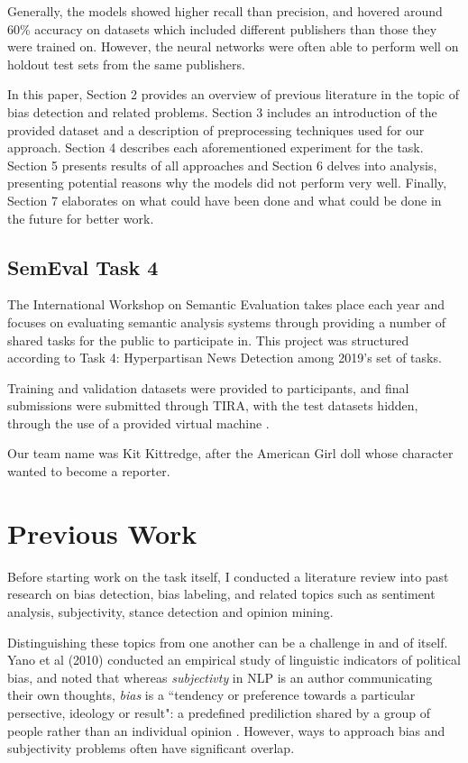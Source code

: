 \documentclass[11pt, a4paper]{article}
\begin{document}
Generally, the models showed higher recall than precision, and hovered around 60\% accuracy on datasets which included different publishers than those they were trained on. However, the neural networks were often able to perform well on holdout test sets from the same publishers.

In this paper, Section 2 provides an overview of previous literature in the topic of bias detection and related problems. Section 3 includes an introduction of the provided dataset and a description of preprocessing techniques used for our approach. Section 4 describes each aforementioned experiment for the task. Section 5 presents results of all approaches and Section 6 delves into analysis, presenting potential reasons why the models did not perform very well. Finally, Section 7 elaborates on what could have been done and what could be done in the future for better work.

\subsection{SemEval Task 4}

The International Workshop on Semantic Evaluation takes place each year and focuses on evaluating semantic analysis systems through providing a number of shared tasks for the public to participate in. This project was structured according to Task 4: Hyperpartisan News Detection among 2019's set of tasks.

Training and validation datasets were provided to participants, and final submissions were submitted through TIRA, with the test datasets hidden, through the use of a provided virtual machine \cite{potthast:2019}.

Our team name was Kit Kittredge, after the American Girl doll whose character wanted to become a reporter.

\section{Previous Work}

Before starting work on the task itself, I conducted a literature review into past research on bias detection, bias labeling, and related topics such as sentiment analysis, subjectivity, stance detection and opinion mining.

Distinguishing these topics from one another can be a challenge in and of itself. Yano et al (2010) conducted an empirical study of linguistic indicators of political bias, and noted that whereas \textit{subjectivty} in NLP is an author communicating their own thoughts, \textit{bias} is a ``tendency or preference towards a particular persective, ideology or result": a predefined prediliction shared by a group of people rather than an individual opinion \cite{yano2010shedding}. However, ways to approach bias and subjectivity problems often have significant overlap.
\end{document}
